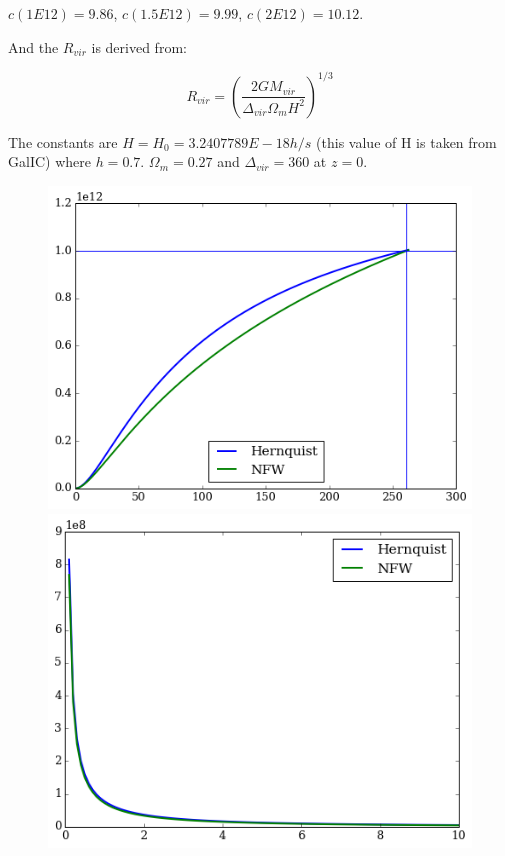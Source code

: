 $c(1E12) = 9.86$, $c(1.5E12) = 9.99$, $c(2E12) = 10.12$. 

And the $R_{vir}$ is derived from:

\begin{equation}
R_{vir} = \left( \dfrac{2 G M_{vir} }{\Delta_{vir} \Omega_m H^2 } \right)^{1/3}
\end{equation}

The constants are $H = H_0 = 3.2407789E-18 h/s$ (this value of H is taken 
from GalIC) where $h=0.7$. $\Omega_m = 0.27$ and $\Delta_{vir}=360$ at $z=0$. 

\begin{figure}[H]
\centering
\includegraphics[scale=0.4]{MW_enclosedM.png}
\includegraphics[scale=0.4]{MW_enclosedRho.png}
\end{figure}

